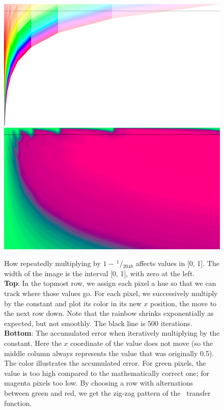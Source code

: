 \documentclass[twocolumn]{article}
\newcommand\sfrac[2]{\!{}\,^{#1}\!/{}\!_{#2}}
\begin{document}
\begin{figure}[tp]
  \includegraphics[width=0.95 \linewidth]{rainbow} \\[1em]
  \includegraphics[width=0.95 \linewidth]{rainbow-error}
  \caption{
    How repeatedly multiplying by $1 - \sfrac{1}{2048}$ affects values in
    [0, 1].
    The width of the image is the interval [0, 1], with zero at the left.
    \\[1em]
    {\bf Top}: In the topmost row, we assign each pixel a hue so that
    we can track where those values go. For each pixel, we
    successively multiply by the constant and plot its color in its
    new $x$ position, the move to the next row down. Note that the
    rainbow shrinks exponentially as expected, but not smoothly.
    The black line is 500 iterations.
    \\[1em]
    {\bf Bottom}: The accumulated error when iteratively multiplying
    by the constant. Here the $x$ coordinate of the value does not move
    (so the middle column always represents the value that was
    originally 0.5). The color illustrates the accumulated error. For
    green pixels, the value is too high compared to the mathematically
    correct one; for magenta pixels too low. By choosing a row with
    alternations between green and red, we get the zig-zag pattern of
    the \gradone\ transfer function.
  } \label{fig:rainbow}
\end{figure}
\end{document}
